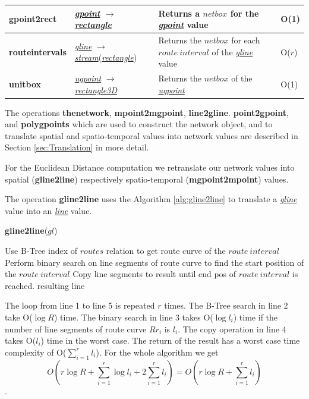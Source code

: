 \documentclass[a4paper]{article}
\newcommand{\op}[1]{\textbf{#1}}
\newcommand{\dt}[1]{\textsl{\underline{#1}}}
\begin{document}
\begin{table}
\begin{center}
\begin{tabularx}{1.0\textwidth}{|l|l|X|l|}
  \hline
\op{gpoint2rect}& \dt{gpoint} $\rightarrow$ \dt{rectangle} & Returns a $netbox$
for the \dt{gpoint} value & O(1)\\
  \hline
\op{routeintervals}&\dt{gline} $\rightarrow$ \dt{stream}(\dt{rectangle})& Returns
the $netbox$ for each $route\ interval$ of the \dt{gline} value& O($r$)\\
  \hline
  \op{unitbox}& \dt{ugpoint} $\rightarrow$ \dt{rectangle3D} & Returns the $netbox$
of the \dt{ugpoint} & O(1)\\
  \hline
  \end{tabularx}
  \end{center}
\end{table}

The operations \op{thenetwork}, \op{mpoint2mgpoint}, \op{line2gline}.
\op{point2gpoint}, and \op{polygpoints} which are used to construct the network
object, and to translate spatial and spatio-temporal values into network values
are described in Section  \ref{sec:Translation} in more detail.

For the Euclidean Distance computation we retranslate our network values into
spatial (\op{gline2line}) respectively spatio-temporal (\op{mgpoint2mpoint})
values.

The operation \op{gline2line} uses the Algorithm \ref{alg:gline2line} to
translate a \dt{gline} value into an \dt{line} value. 
\begin{algorithm}
  \caption{\op{gline2line}($gl$)}
  \label{alg:gline2line}
  \begin{algorithmic}[1]
      \STATE Use B-Tree index of $routes$ relation to get route curve of the
$route\ interval$
      \STATE Perform binary search on line segments of route curve to find the
      start position of the $route\ interval$
      \STATE Copy line segments to result until end pos of $route\ interval$ is
reached.
    \ENDFOR
    \RETURN resulting line
  \end{algorithmic}
\end{algorithm}
The loop from line 1 to
line 5 is repeated $r$ times. The B-Tree search in line 2 take O($\log{R}$)
time. The binary search in line 3 takes O($\log l_i$) time if the number of line
segments of route curve $Rr_i$ is $l_i$. The copy operation in line 4 takes
O($l_i$) time in the worst case. The return of the result has a worst case
time complexity of O($\sum_{i=1}^{r}{l_i}$). For the whole algorithm we
get
\[O(r \log{R} + \sum_{i=1}^{r}{\log{l_i}} + 2\sum_{i=1}^{r}{l_i}) 
= O(r \log{R} + \sum_{i=1}^{r}{l_i})\].
\end{document}
